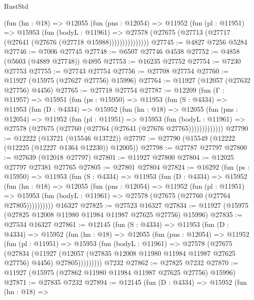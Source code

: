 \begin{lexlean}{RustStd}
\begin{coremodule}
              (fun (hn : @18) =>
              @12055
                (fun (pns : @12054) =>
                @11952
                  (fun (pl : @11951) =>
                  @15953
                    (fun (bodyL : @11961) =>
                    @27578 (@27675 (@27713 (@27717 (@27641 (@27676 (@27718 @15988)))))))))))))))
@27745 := @4827 @7256 @5284
@27746 := @7006 @27745
@27748 := @6507 @27746 @4538
@27752 := @4858 (@5603 (@4889 @27748)) @4895
@27753 := @16235 @27752
@27754 := @7230 @27753
@27755 := @27743 @27754
@27756 := @27708 @27754
@27760 := @11927 (@15975 (@27627 @27756) @15996)
@27764 := @11927 (@12057 (@27632 @27756) @4456)
@27765 := @27718 @27754
@27787 := @12209
    (fun (Γ : @11957) =>
    @15951
      (fun (ps : @15950) =>
      @11953
        (fun (S : @4334) =>
        @11953
          (fun (D : @4334) =>
          @15952
            (fun (hn : @18) =>
            @12055
              (fun (pns : @12054) =>
              @11952
                (fun (pl : @11951) =>
                @15953
                  (fun (bodyL : @11961) =>
                  @27578 (@27675 (@27760 (@27764 (@27641 (@27676 @27765)))))))))))))
@27790 := @12222 (@13721 (@15546 @13722))
@27797 := @27790 (@15549 (@12222 (@12225 (@12227 @1364 @12230)) @12005))
@27798 := @27787 @27797
@27800 := @27639 (@12018 @27797)
@27801 := @11927 @27800
@27804 := @12025 @27797 @27381 @27765
@27805 := @27801 @27804
@27824 := @16292
    (fun (ps : @15950) =>
    @11953
      (fun (S : @4334) =>
      @11953
        (fun (D : @4334) =>
        @15952
          (fun (hn : @18) =>
          @12055
            (fun (pns : @12054) =>
            @11952
              (fun (pl : @11951) =>
              @15953 (fun (bodyL : @11961) => @27578 (@27675 (@27760 (@27764 @27805))))))))))
    @16327
@27825 := @27523 @16327
@27834 := @11927 (@15975 (@27825 @12008 @11980 @11984 @11987 @27625 @27756) @15996)
@27835 := @27534 @16327
@27861 := @12145
    (fun (S : @4334) =>
    @11953
      (fun (D : @4334) =>
      @15952
        (fun (hn : @18) =>
        @12055
          (fun (pns : @12054) =>
          @11952
            (fun (pl : @11951) =>
            @15953
              (fun (bodyL : @11961) =>
              @27578
                (@27675
                  (@27834
                    (@11927
                      (@12057 (@27835 @12008 @11980 @11984 @11987 @27625 @27756) @4456)
                      @27805)))))))))
    @7232
@27862 := @27825 @7232
@27870 := @11927 (@15975 (@27862 @11980 @11984 @11987 @27625 @27756) @15996)
@27871 := @27835 @7232
@27894 := @12145
    (fun (D : @4334) =>
    @15952
      (fun (hn : @18) =>

\end{coremodule}
\end{lexlean}
